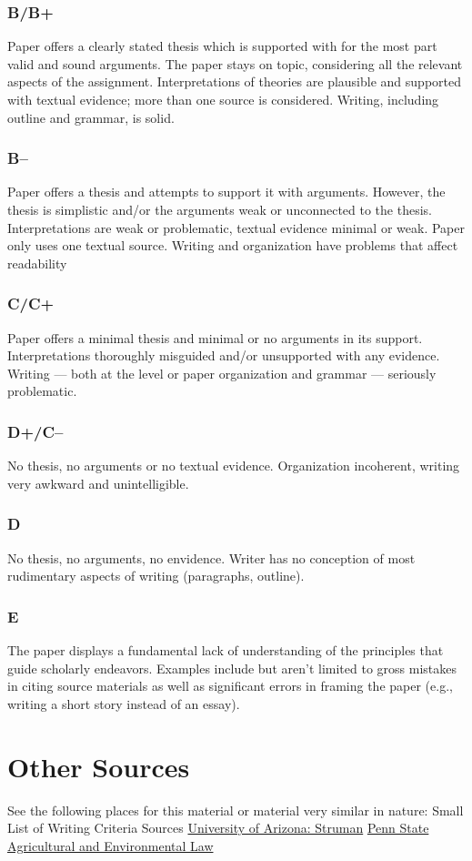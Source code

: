 \documentclass{article}
\begin{document}
\subsubsection{B/B+} Paper offers a clearly stated thesis which is supported with for the most part valid and sound arguments. The paper stays on topic, considering all the relevant aspects of the assignment. Interpretations of theories are plausible and supported with textual evidence; more than one source is considered. Writing, including outline and grammar, is solid.
\subsubsection{B–} Paper offers a thesis and attempts to support it with arguments. However, the thesis is simplistic and/or the arguments weak or unconnected to the thesis. Interpretations are weak or problematic, textual evidence minimal or weak. Paper only uses one textual source. Writing and organization have problems that affect readability
\subsubsection{C/C+} Paper offers a minimal thesis and minimal or no arguments in its support. Interpretations thoroughly misguided and/or unsupported with any evidence. Writing — both at the level or paper organization and grammar — seriously problematic.
\subsubsection{D+/C–} No thesis, no arguments or no textual evidence. Organization incoherent, writing very awkward and unintelligible.
\subsubsection{D} No thesis, no arguments, no envidence. Writer has no conception of most rudimentary aspects of writing (paragraphs, outline).
\subsubsection{E} The paper displays a fundamental lack of understanding of the principles that guide scholarly endeavors. Examples include but aren’t limited to gross mistakes in citing source materials as well as significant errors in framing the paper (e.g., writing a short story instead of an essay).
\section{Other Sources}
See the following places for this material or material very similar in nature:
\pex Small List of Writing Criteria Sources
\a \href{http://www.u.arizona.edu/~sturman/syllabus/107labs/writing.html}{University of Arizona: Struman}
\a \href{http://agenvlaw.aers.psu.edu/AG301W/gradetips.htm}{Penn State Agricultural and Environmental Law}
\xe
\end{document}
